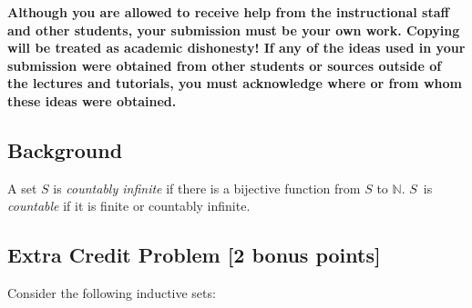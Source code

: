 \documentclass[11pt,fleqn]{article}
\begin{document}
\textbf{Although you are allowed to receive help from the
  instructional staff and other students, your submission must be your
  own work.  Copying will be treated as academic dishonesty! If any of
  the ideas used in your submission were obtained from other students
  or sources outside of the lectures and tutorials, you must
  acknowledge where or from whom these ideas were obtained.}

\newpage

\subsection*{Background}

A set $S$ is \emph{countably infinite} if there is a bijective
function from $S$ to $\mathbb{N}$.  $S$~is \emph{countable} if it is
finite or countably infinite.  


\subsection*{Extra Credit Problem \textbf{[2 bonus points]}}

Consider the following inductive sets:
\end{document}
